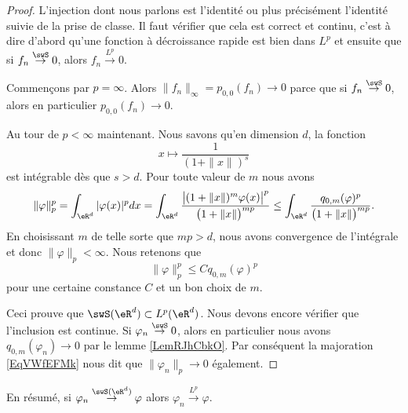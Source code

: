 \begin{proof}
    L'injection dont nous parlons est l'identité ou plus précisément l'identité suivie de la prise de classe. Il faut vérifier que cela est correct et continu, c'est à dire d'abord qu'une fonction à décroissance rapide est bien dans \( L^p\) et ensuite que si \( f_n\stackrel{\swS}{\to}0\), alors \( f_n\stackrel{L^p}{\to}0\).
    
    Commençons par \( p=\infty\). Alors \( \| f_n \|_{\infty}=p_{0,0}(f_n)\to 0\) parce que si \( f_n\stackrel{\swS}{\to}0\), alors en particulier \( p_{0,0}(f_n)\to 0\).

    Au tour de \( p<\infty\) maintenant. Nous savons qu'en dimension \( d\), la fonction
    \begin{equation}
        x\mapsto \frac{1}{ (1+\| x \|)^s }
    \end{equation}
    est intégrable dès que \( s>d\).
    Pour toute valeur de \( m\) nous avons
    \begin{equation}
        \| \varphi \|_p^p=\int_{\eR^d}| \varphi(x) |^pdx=\int_{\eR^d}\frac{ \big|    (1+\| x \|)^m\varphi(x)   \big|^p }{ \big( 1+\| x \| \big)^{mp} }\leq\int_{\eR^d}\frac{q_{0,m}(\varphi)^p}{ \big( 1+\| x \| \big)^{mp} }.
    \end{equation}
    En choisissant \( m\) de telle sorte que \( mp>d\), nous avons convergence de l'intégrale et donc \( \| \varphi \|_p<\infty\). Nous retenons que
    \begin{equation}    \label{EqVWfEFMk}
        \| \varphi \|_p^p\leq Cq_{0,m}(\varphi)^p
    \end{equation}
    pour une certaine constance \( C\) et un bon choix de \( m\).

    Ceci prouve que \( \swS(\eR^d)\subset L^p(\eR^d)\). Nous devons encore vérifier que l'inclusion est continue. Si \( \varphi_n\stackrel{\swS}{\to}0\), alors en particulier nous avons \( q_{0,m}(\varphi_n)\to 0\) par le lemme \ref{LemRJhCbkO}. Par conséquent la majoration \eqref{EqVWfEFMk} nous dit que \( \| \varphi_n \|_p\to 0\) également.

\end{proof}
En résumé, si \( \varphi_n\stackrel{\swS(\eR^d)}{\to}\varphi\) alors \( \varphi_n\stackrel{L^p}{\to}\varphi\).



